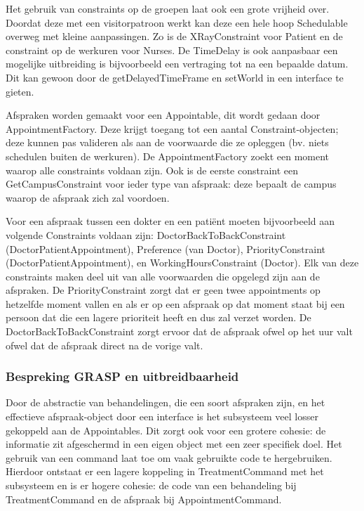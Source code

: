 \documentclass[a4paper]{article}
\begin{document}
Het gebruik van constraints op de groepen laat ook een grote vrijheid over. Doordat deze met een visitorpatroon werkt kan deze een hele hoop Schedulable overweg met kleine aanpassingen. Zo is de XRayConstraint voor Patient en de constraint op de werkuren voor Nurses. De TimeDelay is ook aanpasbaar een mogelijke uitbreiding is bijvoorbeeld een vertraging tot na een bepaalde datum. Dit kan gewoon door de getDelayedTimeFrame en setWorld in een interface te gieten.

Afspraken worden gemaakt voor een Appointable, dit wordt gedaan door AppointmentFactory. Deze krijgt toegang tot een aantal Constraint-objecten; deze kunnen pas valideren als aan de voorwaarde die ze opleggen (bv. niets schedulen buiten de werkuren). De AppointmentFactory zoekt een moment waarop alle constraints voldaan zijn. Ook is de eerste constraint een GetCampusConstraint voor ieder type van afspraak: deze bepaalt de campus waarop de afspraak zich zal voordoen.

Voor een afspraak tussen een dokter en een pati\"ent moeten bijvoorbeeld aan volgende Constraints voldaan zijn: 
DoctorBackToBackConstraint (DoctorPatientAppointment), Preference (van Doctor), PriorityConstraint (DoctorPatientAppointment),  en WorkingHoursConstraint (Doctor). 
Elk van deze constraints maken deel uit van alle voorwaarden die opgelegd zijn aan de afspraken. 
De PriorityConstraint zorgt dat er geen twee appointments op hetzelfde moment vallen en als er op een afspraak op dat moment staat bij een persoon dat die een lagere prioriteit heeft en dus zal verzet worden. De DoctorBackToBackConstraint zorgt ervoor dat de afspraak ofwel op het uur valt ofwel dat de afspraak direct na de vorige valt.

\subsubsection{Bespreking GRASP en uitbreidbaarheid}
Door de abstractie van behandelingen, die een soort afspraken zijn, en het effectieve afspraak-object door een interface is het subsysteem veel losser gekoppeld aan de Appointables.
Dit zorgt ook voor een grotere cohesie: de informatie zit afgeschermd in een eigen object met een zeer specifiek doel. Het gebruik van een command laat toe om vaak gebruikte code te hergebruiken. Hierdoor ontstaat er een lagere koppeling in TreatmentCommand met het subsysteem en is er hogere cohesie: de code van een behandeling bij TreatmentCommand en de afspraak bij AppointmentCommand.
\end{document}
